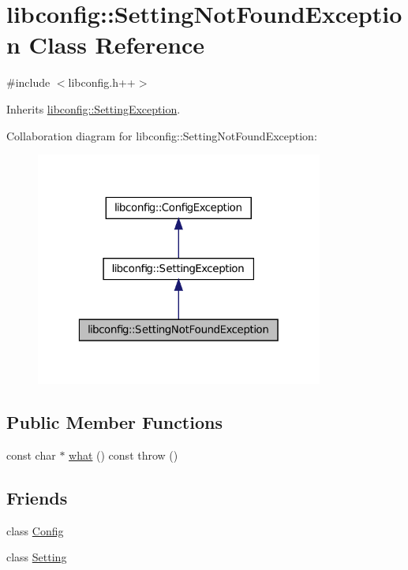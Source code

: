 \hypertarget{classlibconfig_1_1_setting_not_found_exception}{
\section{libconfig::SettingNotFoundException Class Reference}
\label{classlibconfig_1_1_setting_not_found_exception}
}


{\ttfamily \#include $<$libconfig.h++$>$}



Inherits \hyperlink{classlibconfig_1_1_setting_exception}{libconfig::SettingException}.



Collaboration diagram for libconfig::SettingNotFoundException:
\nopagebreak
\begin{figure}[H]
\begin{center}
\leavevmode
\includegraphics[width=268pt]{classlibconfig_1_1_setting_not_found_exception__coll__graph}
\end{center}
\end{figure}
\subsection*{Public Member Functions}
\begin{DoxyCompactItemize}
\item 
const char $\ast$ \hyperlink{classlibconfig_1_1_setting_not_found_exception_a10ddbf9dfba0e1d43e84ad9f746f4dc3}{what} () const   throw ()
\end{DoxyCompactItemize}
\subsection*{Friends}
\begin{DoxyCompactItemize}
\item 
class \hyperlink{classlibconfig_1_1_setting_not_found_exception_ac3da7e21a05bf8852638db7e4dd1b81a}{Config}
\item 
class \hyperlink{classlibconfig_1_1_setting_not_found_exception_a9aa0bc1c3d297cabf9a1848178294d38}{Setting}
\end{DoxyCompactItemize}


